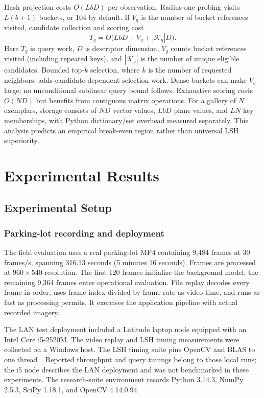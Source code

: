 \documentclass[conference]{IEEEtran}
\begin{document}
Hash projection costs $O(LbD)$ per observation. Radius-one probing visits $L(b+1)$ buckets, or 104 by default. If $V_q$ is the number of bucket references visited, candidate collection and scoring cost
\begin{equation}
T_q=O\bigl(LbD+V_q+|\mathcal K_q|D\bigr).
\end{equation}
Here $T_q$ is query work, $D$ is descriptor dimension, $V_q$ counts bucket references visited (including repeated keys), and $|\mathcal K_q|$ is the number of unique eligible candidates. Bounded top-$k$ selection, where $k$ is the number of requested neighbors, adds candidate-dependent selection work. Dense buckets can make $V_q$ large; no unconditional sublinear query bound follows. Exhaustive scoring costs $O(ND)$ but benefits from contiguous matrix operations. For a gallery of $N$ exemplars, storage consists of $ND$ vector values, $LbD$ plane values, and $LN$ key memberships, with Python dictionary/set overhead measured separately. This analysis predicts an empirical break-even region rather than universal LSH superiority.

\section{Experimental Results}
\subsection{Experimental Setup}
\subsubsection{Parking-lot recording and deployment}
The field evaluation uses a real parking-lot MP4 containing 9,484 frames at 30 frames/s, spanning 316.13 seconds (5 minutes 16 seconds). Frames are processed at $960\times540$ resolution. The first 120 frames initialize the background model; the remaining 9,364 frames enter operational evaluation. File replay decodes every frame in order, uses frame index divided by frame rate as video time, and runs as fast as processing permits. It exercises the application pipeline with actual recorded imagery.

The LAN test deployment included a Latitude laptop node equipped with an Intel Core i5-2520M. The video replay and LSH timing measurements were collected on a Windows host. The LSH timing suite pins OpenCV and BLAS to one thread~\cite{numpyglobal}. Reported throughput and query timings belong to those local runs; the i5 node describes the LAN deployment and was not benchmarked in these experiments. The research-suite environment records Python 3.14.3, NumPy 2.5.3, SciPy 1.18.1, and OpenCV 4.14.0.94.
\end{document}
